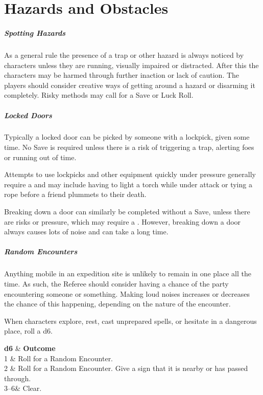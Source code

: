 \documentclass[itdr]{subfiles}
\begin{document}
\chapter{Hazards and Obstacles}

\paragraph{Spotting Hazards}
As a general rule the presence of a trap or other hazard is always noticed by characters unless they are running, visually impaired or distracted. After this the characters may be harmed through further inaction or lack of caution. The players should consider creative ways of getting around a hazard or disarming it completely. Risky methods may call for a Save or Luck Roll.

\paragraph{Locked Doors}
Typically a locked door can be picked by someone with a lockpick, given some time. No Save is required unless there is a risk of triggering a trap, alerting foes or running out of time.

Attempts to use lockpicks and other equipment quickly under pressure generally require a  and may include having to light a torch while under attack or tying a rope before a friend plummets to their death.

Breaking down a door can similarly be completed without a Save, unless there are risks or pressure, which may require a . However, breaking down a door always causes lots of noise and can take a long time.

\paragraph{Random Encounters}
Anything mobile in an expedition site is unlikely to remain in one place all the time. As such, the Referee should consider having a chance of the party encountering someone or something. Making loud noises increases or decreases the chance of this happening, depending on the nature of the encounter.

When characters explore, rest, cast unprepared spells, or hesitate in a dangerous place, roll a d6.

\begin{dtable}[cL]
	\textbf{d6} & \textbf{Outcome} \\
	1	& Roll for a Random Encounter.\\
	2	& Roll for a Random Encounter. Give a sign that it is nearby or has passed through.\\
	3--6& Clear.\\
\end{dtable}
\end{document}

